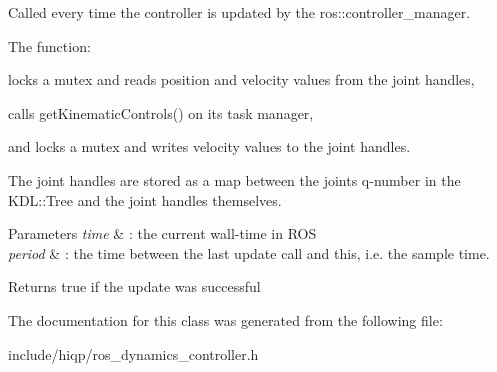 Called every time the controller is updated by the ros\-::controller\-\_\-manager. 

The function\-: 
\begin{DoxyEnumerate}
\item locks a mutex and reads position and velocity values from the joint handles, 
\item calls get\-Kinematic\-Controls() on its task manager, 
\item and locks a mutex and writes velocity values to the joint handles. 
\end{DoxyEnumerate}The joint handles are stored as a map between the joints q-\/number in the K\-D\-L\-::\-Tree and the joint handles themselves.


\begin{DoxyParams}{Parameters}
{\em time} & \-: the current wall-\/time in R\-O\-S \\
\hline
{\em period} & \-: the time between the last update call and this, i.\-e. the sample time. \\
\hline
\end{DoxyParams}
\begin{DoxyReturn}{Returns}
true if the update was successful 
\end{DoxyReturn}


The documentation for this class was generated from the following file\-:\begin{DoxyCompactItemize}
\item 
include/hiqp/ros\-\_\-dynamics\-\_\-controller.\-h\end{DoxyCompactItemize}
